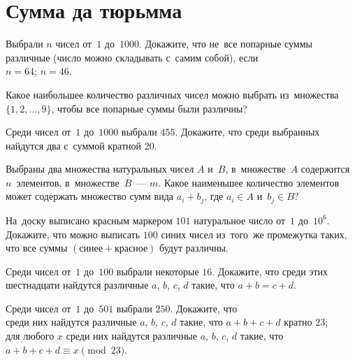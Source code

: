 
\section*{Сумма да тюрьмма}


\begin{problems}

\item
Выбрали $n$ чисел от~$1$ до~$1000$.
Докажите, что не~все попарные суммы различные (число можно складывать с~самим
собой), если
\\
\subproblem $n = 64$;
\qquad
\subproblem $n = 46$.

\item
Какое наибольшее количество различных чисел можно выбрать из~множества
$\{ 1, 2, \ldots, 9 \}$, чтобы все попарные суммы были различны?

\item
Среди чисел от~$1$ до~$1000$ выбрали $455$.
Докажите, что среди выбранных найдутся два с~суммой кратной $20$.

\item
Выбраны два множества натуральных чисел $A$ и~$B$, в~множестве~$A$ содержится
$n$~элементов, в~множестве~$B$~--- $m$.
Какое наименьшее количество элементов может содержать множество сумм вида
$a_{i} + b_{j}$, где $a_{i} \in A$ и~$b_{j} \in B$?

\item
На~доску выписано красным маркером $101$ натуральное число от~$1$ до~$10^6$.
Докажите, что можно выписать $100$ синих чисел из~того~же промежутка таких, что
все суммы $(\text{синее} + \text{красное})$ будут различны.

\item
Среди чисел от~$1$ до~$100$ выбрали некоторые $16$.
Докажите, что среди этих шестнадцати найдутся различные $a$, $b$, $c$, $d$
такие, что $a + b = c + d$.

\item
Среди чисел от~$1$ до~$501$ выбрали $250$.
Докажите, что
\\
\subproblem
среди них найдутся различные $a$, $b$, $c$, $d$ такие, что $a + b + c + d$
кратно $23$;
\\
\subproblem
для любого $x$ среди них найдутся различные $a$, $b$, $c$, $d$ такие, что
$a + b + c + d \equiv x \pmod{23}$.

\end{problems}

